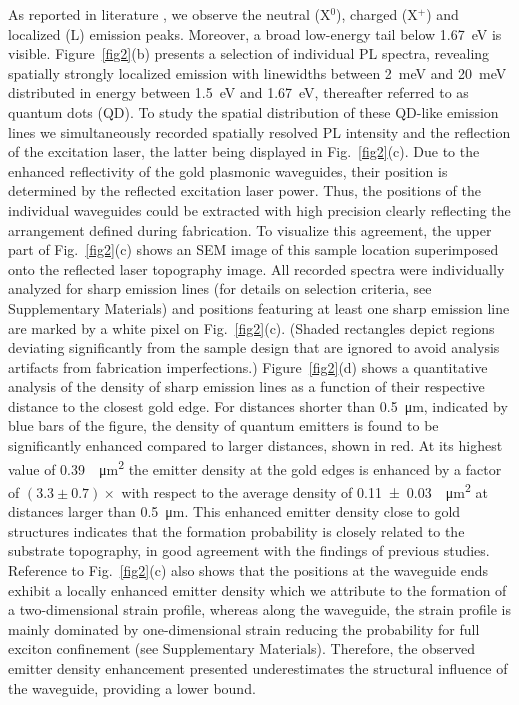 \documentclass[journal=nalefd,manuscript=letter]{achemso}
\begin{document}
As reported in literature \cite{Jones.2013}, we observe the neutral (X$^0$), charged (X$^+$) and localized (L) emission peaks.
Moreover, a broad low-energy tail below \SI{1.67}{\electronvolt} is visible.
Figure~\ref{fig2}(b) presents a selection of individual PL spectra, revealing spatially strongly localized emission with linewidths between \SI{2}{\milli\electronvolt} and \SI{20}{\milli\electronvolt} distributed in energy between \SI{1.5}{\electronvolt} and \SI{1.67}{\electronvolt}, thereafter referred to as quantum dots (QD).
To study the spatial distribution of these QD-like emission lines we simultaneously recorded spatially resolved PL intensity and the reflection of the excitation laser, the latter being displayed in Fig.~\ref{fig2}(c).
Due to the enhanced reflectivity of the gold plasmonic waveguides, their position is determined by the reflected excitation laser power.
Thus, the positions of the individual waveguides could be extracted with high precision clearly reflecting the arrangement defined during fabrication.
To visualize this agreement, the upper part of Fig.~\ref{fig2}(c) shows an SEM image of this sample location superimposed onto the reflected laser topography image.
All recorded spectra were individually analyzed for sharp emission lines (for details on selection criteria, see Supplementary Materials) and positions featuring at least one sharp emission line are marked by a white pixel on Fig.~\ref{fig2}(c). (Shaded rectangles depict regions deviating significantly from the sample design that are ignored to avoid analysis artifacts from fabrication imperfections.)
Figure~\ref{fig2}(d) shows a quantitative analysis of the density of sharp emission lines as a function of their respective distance to the closest gold edge.
For distances shorter than \SI{0.5}{\micro\meter}, indicated by blue bars of the figure, the density of quantum emitters is found to be significantly enhanced compared to larger distances, shown in red. At its highest value of \SI{0.39}{\per\micro\meter\squared} the emitter density at the gold edges is enhanced by a factor of $(3.3 \pm 0.7)\times$ with respect to the average density of \SI{0.11 \pm 0.03}{\per\micro\meter\squared} at distances larger than \SI{0.5}{\micro\meter}.
This enhanced emitter density close to gold structures indicates that the formation probability is closely related to the substrate topography, in good agreement with the findings of previous studies\cite{Kern.2016,Branny.,PalaciosBerraquero.2017}.
Reference to Fig.~\ref{fig2}(c) also shows that the positions at the waveguide ends exhibit a locally enhanced emitter density which we attribute to the formation of a two-dimensional strain profile, whereas along the waveguide, the strain profile is mainly dominated by one-dimensional strain reducing the probability for full exciton confinement (see Supplementary Materials).
Therefore, the observed emitter density enhancement presented underestimates the structural influence of the waveguide, providing a lower bound.
\end{document}
